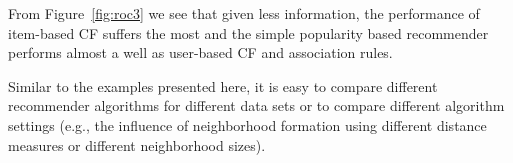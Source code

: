 \documentclass[nojss]{jss}
\begin{document}
From Figure~\ref{fig:roc3} we see that given less information, 
the performance of item-based CF suffers the most and the simple 
popularity based recommender performs almost a well as user-based CF and 
association rules.

Similar to the examples presented here, it is easy to compare different
recommender algorithms for different data sets or to compare
different algorithm settings (e.g.,
the influence of neighborhood formation using different distance measures or different neighborhood sizes).


%
%
%
%
%
%
%
%
%
\end{document}
